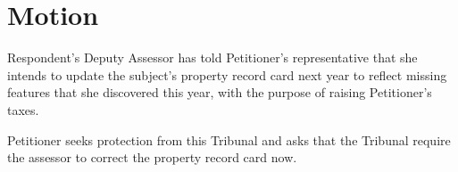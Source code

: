 \documentclass[12pt,\documentclassflag]{michiganCourtOfAppealsBrief}
\begin{document}






\section{Motion}

Respondent's Deputy Assessor has told Petitioner's representative that she intends to update the subject's property record card next year to reflect missing features that she discovered this year, with the purpose of raising Petitioner's taxes.

Petitioner seeks protection from this Tribunal and asks that the Tribunal require the assessor to correct the property record card now.
\end{document}
